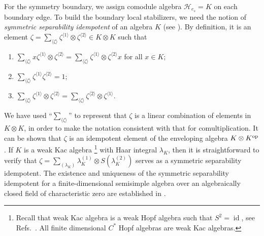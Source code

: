 \documentclass[a4paper,11pt]{article}
\theoremstyle{theorem}
\theoremstyle{remark}
\newcommand{\id}{\operatorname{id}}
\begin{document}
For the symmetry boundary, we assign comodule algebra $\mathcal{H}_{e_s}=K$ on each boundary edge.
To build the boundary local stabilizers, we need the notion of \emph{symmetric separability idempotent} of an algebra $K$ (see \cite{aguiar2000note,koppen2020defects,jia2023boundary,Jia2023weak}).
By definition, it is an element $\zeta = \sum_{\langle \zeta \rangle} \zeta^{\langle 1 \rangle} \otimes \zeta^{\langle 2 \rangle} \in K \otimes K$ such that
\begin{enumerate}
    \item $\sum_{\langle \zeta \rangle} x \zeta^{\langle 1 \rangle} \otimes \zeta^{\langle 2 \rangle} = \sum_{\langle \zeta \rangle} \zeta^{\langle 1 \rangle} \otimes \zeta^{\langle 2 \rangle} x$ for all $x \in K$;
    \item $\sum_{\langle \zeta \rangle} \zeta^{\langle 1 \rangle} \zeta^{\langle 2 \rangle} = 1$;
    \item $\sum_{\langle \zeta \rangle} \zeta^{\langle 1 \rangle} \otimes \zeta^{\langle 2 \rangle} = \sum_{\langle \zeta \rangle} \zeta^{\langle 2 \rangle} \otimes \zeta^{\langle 1 \rangle}$.
\end{enumerate}
We have used ``$\sum_{\langle \zeta \rangle}$'' to represent that $\zeta$ is a linear combination of elements in $K \otimes K$, in order to make the notation consistent with that for comultiplication.
It can be shown that $\zeta$ is an idempotent element of the enveloping algebra $K \otimes K^{\rm op}$. If $K$ is a weak Kac algebra \footnote{Recall that weak Kac algebra is a weak Hopf algebra such that $S^2=\id$, see Refs.~\cite{yamanouchi1994duality,bohm2000weakII}. All finite dimensional $C^*$ Hopf algebras are weak Kac algebras.} with Haar integral $\lambda_K$, then it is straightforward to verify that $\zeta = \sum_{(\lambda_K)} \lambda_K^{(1)} \otimes S(\lambda_K^{(2)})$ serves as a symmetric separability idempotent. The existence and uniqueness of the symmetric separability idempotent for a finite-dimensional semisimple algebra over an algebraically closed field of characteristic zero are established in \cite[Corollary 3.1]{aguiar2000note}. 
\end{document}
